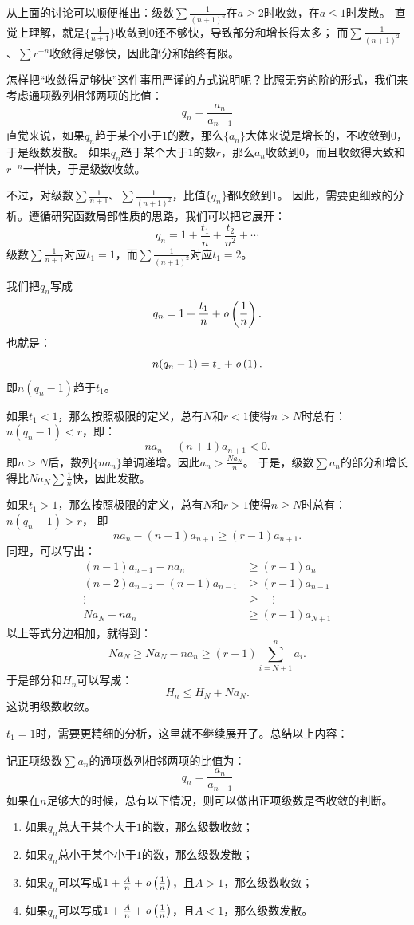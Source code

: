 \documentclass[12pt,UTF8,fontset=none]{ctexbook}
\begin{document}
从上面的讨论可以顺便推出：级数$\sum \frac{1}{(n+1)^a}$在$a\geqslant 2$时收敛，在$a\leqslant 1$时发散。
直觉上理解，就是$\{\frac{1}{n+1}\}$收敛到$0$还不够快，导致部分和增长得太多；
而$\sum \frac{1}{(n+1)^2}$、$\sum r^{-n}$收敛得足够快，因此部分和始终有限。

怎样把“收敛得足够快”这件事用严谨的方式说明呢？比照无穷的阶的形式，我们来考虑通项数列相邻两项的比值：
$$ q_n = \frac{a_n}{a_{n+1}} $$
直觉来说，如果$q_n$趋于某个小于$1$的数，那么$\{a_n\}$大体来说是增长的，不收敛到$0$，于是级数发散。
如果$q_n$趋于某个大于$1$的数$r$，那么$a_n$收敛到$0$，而且收敛得大致和$r^{-n}$一样快，于是级数收敛。

不过，对级数$\sum \frac{1}{n+1}$、$\sum \frac{1}{(n+1)^2}$，比值$\{q_n\}$都收敛到$1$。
因此，需要更细致的分析。遵循研究函数局部性质的思路，我们可以把它展开：
$$ q_n = 1 + \frac{t_1}{n} + \frac{t_2}{n^2} + \cdots $$
级数$\sum \frac{1}{n+1}$对应$t_1 = 1$，而$\sum \frac{1}{(n+1)^2}$对应$t_1 = 2$。

我们把$q_n$写成
$$ q_n = 1 + \frac{t_1}{n} + \mathit{o}\left(\frac{1}{n}\right). $$
也就是：
$$ n(q_n - 1) = t_1 + \mathit{o}\left(1\right).$$
即$n(q_n - 1)$趋于$t_1$。

如果$t_1 < 1$，那么按照极限的定义，总有$N$和$r<1$使得$n>N$时总有：$n(q_n - 1) < r$，即：
$$ na_n - (n+1)a_{n+1} < 0. $$
即$n>N$后，数列$\{na_n\}$单调递增。因此$a_n > \frac{Na_N}{n}$。
于是，级数$\sum a_n$的部分和增长得比$Na_N\sum \frac{1}{n}$快，因此发散。

如果$t_1 > 1$，那么按照极限的定义，总有$N$和$r>1$使得$n\geqslant N$时总有：$n(q_n - 1) > r$，
即
$$ na_n - (n+1)a_{n+1} \geqslant (r - 1)a_{n+1}.  $$
同理，可以写出：
\begin{align*}
    (n-1)a_{n-1} - na_n &\geqslant (r - 1)a_{n}  \\
    (n-2)a_{n-2} - (n-1)a_{n-1} &\geqslant (r - 1)a_{n-1}  \\
    \vdots \quad &\geqslant \quad \vdots  \\
    Na_{N} - na_n &\geqslant (r - 1)a_{N+1} 
\end{align*}
以上等式分边相加，就得到：
$$ Na_{N} \geqslant Na_{N} - na_n \geqslant (r - 1)\sum_{i=N+1}^n a_i. $$
于是部分和$H_n$可以写成：
$$ H_n \leqslant H_N + Na_{N}.$$
这说明级数收敛。

$t_1 = 1$时，需要更精细的分析，这里就不继续展开了。总结以上内容：

记正项级数$\sum a_n$的通项数列相邻两项的比值为：
$$ q_n = \frac{a_n}{a_{n+1}} $$
如果在$n$足够大的时候，总有以下情况，则可以做出正项级数是否收敛的判断。
\begin{enumerate}
    \item 如果$q_n$总大于某个大于$1$的数，那么级数收敛；
    \item 如果$q_n$总小于某个小于$1$的数，那么级数发散；
    \item 如果$q_n$可以写成$1 + \frac{A}{n} + \mathit{o}\left(\frac{1}{n}\right)$，且$A > 1$，那么级数收敛；
    \item 如果$q_n$可以写成$1 + \frac{A}{n} + \mathit{o}\left(\frac{1}{n}\right)$，且$A < 1$，那么级数发散。
\end{enumerate}
\end{document}
